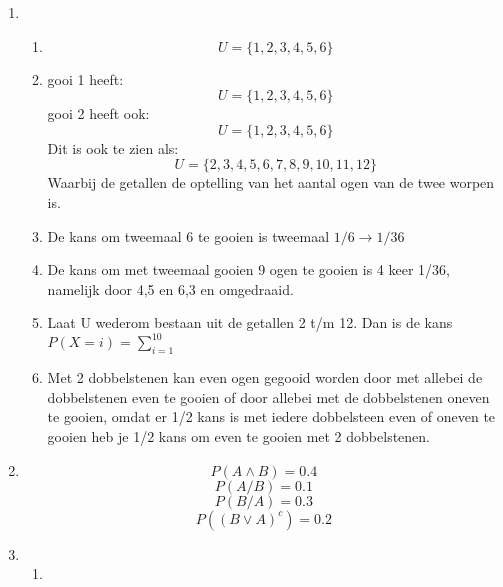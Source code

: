\documentclass[pdftex,12pt,a4paper]{article}
\begin{document}

\begin{enumerate}
    \item
        \begin{enumerate}
            \item
            	$$U=\{1,2,3,4,5,6\}$$
            \item
            	gooi 1 heeft:
            		$$U=\{1,2,3,4,5,6\}$$
            	gooi 2 heeft ook:
            		$$U=\{1,2,3,4,5,6\}$$
            	Dit is ook te zien als:
            		$$U=\{2,3,4,5,6,7,8,9,10,11,12\}$$
            	Waarbij de getallen de optelling van het aantal ogen van de twee
                worpen is.
            \item
            	De kans om tweemaal 6 te gooien is tweemaal
                $1/6 \rightarrow 1/36$
            \item
            	De kans om met tweemaal gooien 9 ogen te gooien is 4 keer 1/36,
                namelijk door 4,5 en 6,3 en omgedraaid.
            \item
            	Laat U wederom bestaan uit de getallen 2 t/m 12.
            	Dan is de kans $P(X=i) = \sum_{i=1}^{10}$
            \item
            	Met 2 dobbelstenen kan even ogen gegooid worden door met allebei
                de dobbelstenen even te gooien of door allebei met de
                dobbelstenen oneven te gooien, omdat er 1/2 kans is met iedere
                dobbelsteen even of oneven te gooien heb je 1/2 kans om even te
                gooien met 2 dobbelstenen.
        \end{enumerate}

    \item
    	$$P(A \wedge B) = 0.4$$
    	$$P(A/B) = 0.1$$
    	$$P(B/A) = 0.3$$
    	$$P((B \vee A)^c) = 0.2$$

	\item
    	\begin{enumerate}
    		\item


\end{enumerate}
\end{enumerate}
\end{document}
